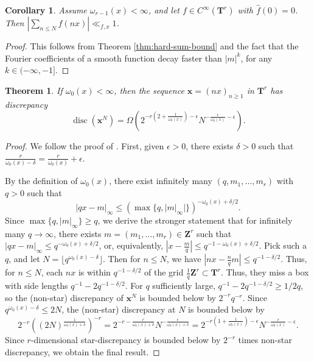 \documentclass{article}
\DeclareMathOperator{\disc}{disc}
\newcommand{\bT}{\mathbf{T}}
\newcommand{\bx}{{\boldsymbol x}}
\newcommand{\bZ}{\mathbf{Z}}
\newtheorem{theorem}[subsection]{Theorem}
\newtheorem{corollary}[subsection]{Corollary}
\theoremstyle{definition}
\begin{document}
\begin{corollary}\label{cor:smooth-bounds}
Assume $\omega_{r-1}(x)<\infty$, and let $f\in C^\infty(\bT^r)$ with 
$\widehat f(0)=0$. Then $\left|\sum_{n\leqslant N} f(n x)\right| \ll_{f,x} 1$. 
\end{corollary}
\begin{proof}
This follows from Theorem \ref{thm:hard-sum-bound} and the fact that the Fourier 
coefficients of a smooth function decay faster than $|m|^k$, for any 
$k\in (-\infty,-1]$. 
\end{proof}

\begin{theorem}\label{thm:discrepancy-lower-bound}
If $\omega_0(x)<\infty$, then the sequence $\bx=(n x)_{n\geqslant 1}$ in 
$\bT^r$ has discrepancy 
\[
	\disc(\bx^N) = \Omega\left(2^{-r\left(2+\frac{1}{\omega_0(x)}\right)-\epsilon} N^{-\frac{r}{\omega_0(x)}-\epsilon}\right) .
\]
\end{theorem}
\begin{proof}
We follow the proof of \cite[Ch.2, Th.3.3]{kuipers-niederreiter-1974}. First, 
given $\epsilon>0$, there exists $\delta>0$ such that 
$\frac{r}{\omega_0(x)-\delta} = \frac{r}{\omega_0(x)}+\epsilon$. 

By the definition of $\omega_0(x)$, there exist infinitely many 
$(q,m_1,\dots,m_r)$ with $q>0$ such that 
\[
	|q x-m|_\infty \leqslant (\max \{q,|m|_\infty|\})^{-\omega_0(x)+\delta/2} .	
\]
Since $\max\{q,|m|_\infty\}\geqslant q$, we derive the stronger statement 
that for infinitely many $q\to \infty$, there exists 
$m=(m_1,\dots,m_r)\in \bZ^r$ such that 
$|q x-m|_\infty \leqslant q^{-\omega_0(x)+\delta/2}$, or, equivalently, 
$|x-\frac{m}{q}| \leqslant q^{-1-\omega_0(x)+\delta/2}$. Pick such a $q$, and 
let $N=\lfloor q^{\omega_0(x)-\delta}\rfloor$. Then for $n\leqslant N$, we have 
$|n x-\frac n q m| \leqslant q^{-1-\delta/2}$. Thus, for $n\leqslant N$, each 
$n x$ is within $q^{-1-\delta/2}$ of the grid $\frac{1}{q} \bZ^r\subset \bT^r$. 
Thus, they miss a box with side lengths $q^{-1}-2 q^{-1-\delta/2}$. For 
$q$ sufficiently large, $q^{-1}-2 q^{-1-\delta/2} \geqslant 1/2q$, so the 
(non-star) discrepancy of $\bx^N$ is bounded below by $2^{-r} q^{-r}$. Since 
$q^{\omega_0(x)-\delta}\leqslant 2 N$, the (non-star) discrepancy at $N$ is 
bounded below by 
\[
	2^{-r} \left((2N)^{\frac{1}{\omega_0(x)+\delta}}\right)^{-r} = 2^{-r-\frac{r}{\omega_0(x)+\delta}} N^{-\frac{r}{\omega_0(x)+\delta}} = 2^{-r\left(1+\frac{1}{\omega_0(x)}\right)-\epsilon} N^{-\frac{r}{\omega_0(x)}-\epsilon} .
\]
Since $r$-dimensional star-discrepancy is bounded below by 
$2^{-r}$ times non-star discrepancy, we obtain the final result.
\end{proof}
\end{document}
